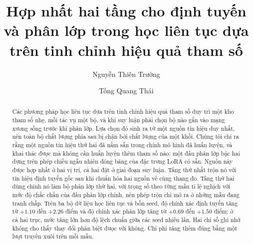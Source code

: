 \documentclass[runningheads]{llncs}
\begin{document}
%
\renewcommand{\andname}{và}
\renewcommand{\abstractname}{Tóm tắt.}
\renewcommand{\keywordname}{{\bf Từ khóa:}}
\renewcommand{\figurename}{Hình}
\renewcommand{\tablename}{Bảng}
\renewcommand{\refname}{Tài liệu tham khảo}
\renewcommand{\proofname}{Chứng minh}
\renewcommand{\ackname}{Lời cảm ơn.}
\renewcommand{\discintname}{Tuyên bố xung đột lợi ích.}
%
%
\title{Hợp nhất hai tầng cho định tuyến và phân lớp trong học liên tục
dựa trên tinh chỉnh hiệu quả tham số}
%
%
\author{Nguyễn Thiên Trường \and Tống Quang Thái}
%
%
%
\maketitle
%
\begin{abstract}
Các phương pháp học liên tục dựa trên tinh chỉnh hiệu quả tham số duy trì một kho
tham số nhẹ, mỗi tác vụ một bộ, và khi suy luận phải chọn bộ nào gắn vào mạng
xương sống trước khi phân lớp. Lựa chọn đó sinh ra từ một nguồn tín hiệu duy
nhất, nên toàn bộ chất lượng phía sau bị chặn bởi chất lượng của một khối. Chúng
tôi chỉ ra rằng một nguồn tín hiệu thứ hai đã nằm sẵn trong chính mô hình đã huấn
luyện, và khai thác được mà không cần huấn luyện thêm tham số nào: một đầu phân
lớp bậc hai dựng trên phép chiếu ngẫu nhiên đóng băng của đặc trưng LoRA có sẵn.
Nguồn này được hợp nhất ở hai vị trí, cả hai đặt ở giai đoạn suy luận. Tầng thứ
nhất trộn nó với tín hiệu định tuyến gốc sau khi chuẩn hóa hai nguồn về cùng
thang đo. Tầng thứ hai dùng chính nó làm bộ phân lớp thứ hai, với trọng số theo
từng mẫu tỉ lệ nghịch với mức độ chắc chắn của đầu phân lớp chính, nên phép trộn
chỉ mở ra ở những mẫu đang tranh chấp. Trên ba bộ dữ liệu học liên tục và bốn
seed, độ chính xác định tuyến tăng từ $+1.10$ đến $+2.26$ điểm và độ chính xác
phân lớp tăng từ $+0.69$ đến $+1.50$ điểm; ở cả hai trục, mức tăng lớn hơn độ
lệch chuẩn giữa các seed nhiều lần. Hai chỉ số ghi nhớ không cho thấy thay đổi
phân biệt được với không. Chi phí tăng thêm đúng bằng một lượt truyền xuôi trên
mỗi mẫu.

\end{abstract}
%
%
%
\end{document}
